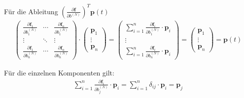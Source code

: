 \documentclass[a4paper, 12pt]{scrartcl}
\begin{document}
Für die Ableitung $\left(\frac{\partial \bm{f}}{\partial b^{(N)}}\right)^T \bm{p}(t)$
\begin{align*}
    \begin{pmatrix}
        \frac{\partial \bm{f}_1}{\partial b^{(N)}_1} 
        &
        \cdots
        &
        \frac{\partial \bm{f}_n}{\partial b^{(N)}_1}
        \\
        \vdots
        &
        \ddots
        &
        \vdots
        \\
        \frac{\partial \bm{f}_1}{\partial b^{(N)}_n}
        &
        \cdots
        &
        \frac{\partial \bm{f}_n}{\partial b^{(N)}_n}
    \end{pmatrix}
    \cdot
    \begin{pmatrix}
        \bm{p}_1 
        \\
        \vdots
        \\
        \bm{p}_n
    \end{pmatrix}
    =
    \begin{pmatrix}
        \sum_{i=1}^{n} \frac{\partial \bm{f}_i}{\partial b^{(N)}_1} \cdot \bm{p}_i
        \\
        \vdots
        \\
        \sum_{i=1}^{n} \frac{\partial \bm{f}_i}{\partial b^{(N)}_n} \cdot \bm{p}_i
    \end{pmatrix}
    =
    \begin{pmatrix}
        \bm{p}_1 
        \\
        \vdots
        \\
        \bm{p}_n
    \end{pmatrix}
    =
    \bm{p}(t)
\end{align*}

Für die einzelnen Komponenten gilt: 
\begin{align*}
    \sum_{i=1}^{n} \frac{\partial \bm{f}_i}{\partial b^{(N)}_j} \cdot \bm{p}_i
    =
    \sum_{i=1}^{n} \delta_{ij} \cdot \bm{p}_i
    =
    \bm{p}_j
\end{align*}
\end{document}
